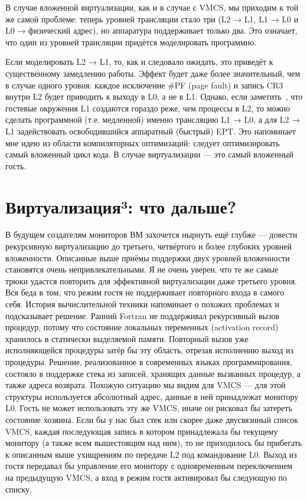 В случае вложенной виртуализации, как и в случае с VMCS, мы приходим к той же самой проблеме: теперь уровней трансляции стало три (L2 → L1, L1 → L0 и L0 → физический адрес), но аппаратура поддерживает только два. Это означает, что один из уровней трансляции придётся моделировать программно.

Если моделировать L2 → L1, то, как и следовало ожидать, это приведёт к существенному замедлению работы. Эффект будет даже более значительный, чем в случае одного уровня: каждое исключение \#PF (\abbr page fault) и запись CR3 внутри L2 будет приводить к выходу в L0, а не в L1. Однако, если заметить , что гостевые окружения L1 создаются гораздо реже, чем процессы в L2, то можно сделать программной (т.е. медленной) именно трансляцию L1 → L0, а для L2 → L1 задействовать освободившийся аппаратный (быстрый) EPT. Это напоминает мне идею из области компиляторных оптимизаций: следует оптимизировать самый вложенный цикл кода. В случае виртуализации — это самый вложенный гость.

\section{Виртуализация³: что дальше?}
В будущем создателям мониторов ВМ захочется нырнуть ещё глубже — довести рекурсивную виртуализацию до третьего, четвёртого и более глубоких уровней вложенности. Описанные выше приёмы поддержки двух уровней вложенности становятся очень непривлекательными. Я не очень уверен, что те же самые трюки удастся повторить для эффективной виртуализации даже третьего уровня. Вся беда в том, что режим гостя не поддерживает повторного входа в самого себя.
История вычислительной техники напоминает о похожих проблемах и подсказывает решение. Ранний Fortran не поддерживал рекурсивный вызов процедур, потому что состояние локальных переменных (activation record) хранилось в статически выделяемой памяти. Повторный вызов уже исполняющейся процедуры затёр бы эту область, отрезав исполнению выход из процедуры. Решение, реализованное в современных языках программирования, состояло в поддержке стека из записей, хранящих данные вызванных процедур, а также адреса возврата.
Похожую ситуацию мы видим для VMCS — для этой структуры используется абсолютный адрес, данные в ней принадлежат монитору L0. Гость не может использовать эту же VMCS, иначе он рисковал бы затереть состояние хозяина. Если бы у нас был стек или скорее даже двусвязнный список VMCS, каждая последующая запись в котором принадлежала бы текущему монитору (а также всем вышестоящим над ним), то не приходилось бы прибегать к описанным выше ухищрениям по передаче L2 под командование L0. Выход из гостя передавал бы управление его монитору с одновременным переключением на предыдущую VMCS, а вход в режим гостя активировал бы следующую по списку.

